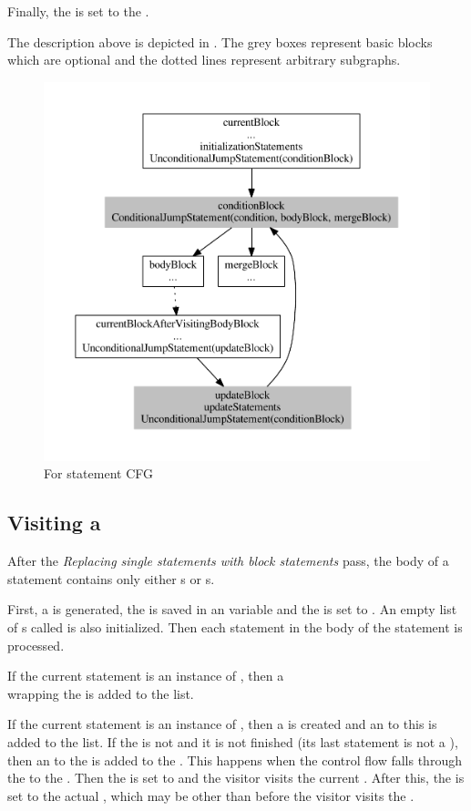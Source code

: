 Finally, the  is set to the .

The description above is depicted in . The grey boxes represent basic blocks
which are optional and the dotted lines represent arbitrary subgraphs.

\begin{figure}[htb]
    \centering
    \includegraphics[width=.5\textwidth]{src/graph/for.pdf}
    \caption{For statement CFG\label{img:for-statement}}
\end{figure}

\subsection{Visiting a }

After the \textit{Replacing single statements with block statements} pass, the body of a  statement
contains only either s or s.

First, a  is generated, the  is saved in an  variable and
the  is set to . An empty list of s called 
is also initialized. Then each statement in the body of the  statement is processed.

If the current statement is an instance of , then a\\
 wrapping the  is added to the  list.

If the current statement is an instance of , then a  is created and an
 to this  is added to the  list. If the
 is not  and it is not finished (its last statement is not a
), then an  to the  is added to the
. This happens when the control flow falls through the  to
the . Then the  is set to  and the visitor visits the current
. After this, the  is set to the actual ,
which may be other than before the visitor visits the .

